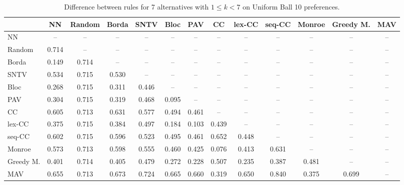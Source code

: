 
\begin{table*}[htbp]
\centering
\begin{tabular}{lcccccccccccc}
\toprule
 & NN & Random & Borda & SNTV & Bloc & PAV & CC & lex-CC & seq-CC & Monroe & Greedy M. & MAV \\
\midrule
NN & -- & -- & -- & -- & -- & -- & -- & -- & -- & -- & -- & -- \\
Random & \cellcolor{blue!71} 0.714 & -- & -- & -- & -- & -- & -- & -- & -- & -- & -- & -- \\
Borda & \cellcolor{blue!14} 0.149 & \cellcolor{blue!71} 0.714 & -- & -- & -- & -- & -- & -- & -- & -- & -- & -- \\
SNTV & \cellcolor{blue!53} 0.534 & \cellcolor{blue!71} 0.715 & \cellcolor{blue!53} 0.530 & -- & -- & -- & -- & -- & -- & -- & -- & -- \\
Bloc & \cellcolor{blue!26} 0.268 & \cellcolor{blue!71} 0.715 & \cellcolor{blue!31} 0.311 & \cellcolor{blue!44} 0.446 & -- & -- & -- & -- & -- & -- & -- & -- \\
PAV & \cellcolor{blue!30} 0.304 & \cellcolor{blue!71} 0.715 & \cellcolor{blue!31} 0.319 & \cellcolor{blue!46} 0.468 & \cellcolor{blue!9} 0.095 & -- & -- & -- & -- & -- & -- & -- \\
CC & \cellcolor{blue!60} 0.605 & \cellcolor{blue!71} 0.713 & \cellcolor{blue!63} 0.631 & \cellcolor{blue!57} 0.577 & \cellcolor{blue!49} 0.494 & \cellcolor{blue!46} 0.461 & -- & -- & -- & -- & -- & -- \\
lex-CC & \cellcolor{blue!37} 0.375 & \cellcolor{blue!71} 0.715 & \cellcolor{blue!38} 0.384 & \cellcolor{blue!49} 0.497 & \cellcolor{blue!18} 0.184 & \cellcolor{blue!10} 0.103 & \cellcolor{blue!43} 0.439 & -- & -- & -- & -- & -- \\
seq-CC & \cellcolor{blue!60} 0.602 & \cellcolor{blue!71} 0.715 & \cellcolor{blue!59} 0.596 & \cellcolor{blue!52} 0.523 & \cellcolor{blue!49} 0.495 & \cellcolor{blue!46} 0.461 & \cellcolor{blue!65} 0.652 & \cellcolor{blue!44} 0.448 & -- & -- & -- & -- \\
Monroe & \cellcolor{blue!57} 0.573 & \cellcolor{blue!71} 0.713 & \cellcolor{blue!59} 0.598 & \cellcolor{blue!55} 0.555 & \cellcolor{blue!46} 0.460 & \cellcolor{blue!42} 0.425 & \cellcolor{blue!7} 0.076 & \cellcolor{blue!41} 0.413 & \cellcolor{blue!63} 0.631 & -- & -- & -- \\
Greedy M. & \cellcolor{blue!40} 0.401 & \cellcolor{blue!71} 0.714 & \cellcolor{blue!40} 0.405 & \cellcolor{blue!47} 0.479 & \cellcolor{blue!27} 0.272 & \cellcolor{blue!22} 0.228 & \cellcolor{blue!50} 0.507 & \cellcolor{blue!23} 0.235 & \cellcolor{blue!38} 0.387 & \cellcolor{blue!48} 0.481 & -- & -- \\
MAV & \cellcolor{blue!65} 0.655 & \cellcolor{blue!71} 0.713 & \cellcolor{blue!67} 0.673 & \cellcolor{blue!72} 0.724 & \cellcolor{blue!66} 0.665 & \cellcolor{blue!66} 0.660 & \cellcolor{blue!31} 0.319 & \cellcolor{blue!65} 0.650 & \cellcolor{blue!84} 0.840 & \cellcolor{blue!37} 0.375 & \cellcolor{blue!69} 0.699 & -- \\
\bottomrule
\end{tabular}

\caption{Difference between rules for 7 alternatives with $1 \leq k < 7$ on Uniform Ball 10 preferences.}
\label{tab:rule_distance_heatmap-m=[7]-pref_dist=euclidean__args__dimensions=10_-_space=uniform_ball}
\end{table*}
    